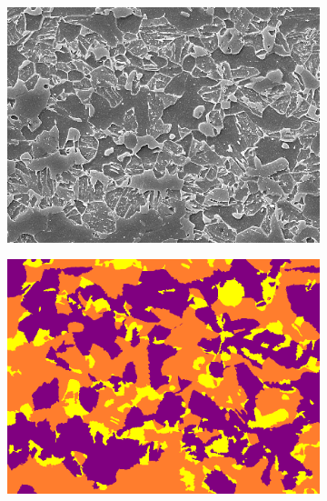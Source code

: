 \documentclass[]{article}
\begin{document}
\begin{figure}[!h]
	\centering
	
	\begin{subfigure}[b]{0.3\textwidth}
		\centering
		\includegraphics[width=\textwidth]{images/inference/A-type-O.jpg}
		\caption{}
		\label{fig:A-type-orig}
	\end{subfigure}
	\hfill
	\begin{subfigure}[b]{0.3\textwidth}
		\centering
		\includegraphics[width=\textwidth]{images/inference/A-type-L.png}
		\caption{}
		\label{fig:A-type-label}
	\end{subfigure}
	\hfill
	\begin{subfigure}[b]{0.3\textwidth}
		\centering

\end{subfigure}
\end{figure}
\end{document}
